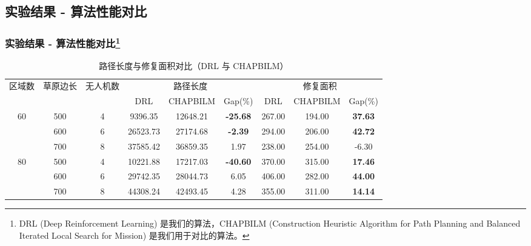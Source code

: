 \documentclass[10pt, aspectratio=169]{beamer}  %
\begin{document}
\subsection{实验结果 - 算法性能对比}
\begin{frame}
	\frametitle{实验结果 - 算法性能对比\footnote{DRL (Deep Reinforcement Learning) 是我们的算法，CHAPBILM (Construction Heuristic Algorithm for Path Planning and Balanced Iterated Local Search for Mission) 是我们用于对比的算法。}}
	\begin{table}
		\centering
		\caption{路径长度与修复面积对比（DRL 与 CHAPBILM）}
		\small %
		\setlength{\tabcolsep}{3pt}
		\begin{tabular}{ccc ccc ccc}
			\toprule
			\multirow{2}{*}{区域数} & \multirow{2}{*}{草原边长} & \multirow{2}{*}{ 无人机数} & \multicolumn{3}{c}{路径长度} & \multicolumn{3}{c}{修复面积}                                                        \\
			\cmidrule(lr){4-6}\cmidrule(lr){7-9}
			                     &                       &                        & DRL                      & CHAPBILM                 & Gap(\%)         & DRL    & CHAPBILM & Gap(\%)        \\
			\midrule
			\multirow{3}{*}{60}
			                     & 500                   & 4                      & 9396.35                  & 12648.21                 & \textbf{-25.68} & 267.00 & 194.00   & \textbf{37.63} \\
			                     & 600                   & 6                      & 26523.73                 & 27174.68                 & \textbf{-2.39}  & 294.00 & 206.00   & \textbf{42.72} \\
			                     & 700                   & 8                      & 37585.42                 & 36859.35                 & 1.97            & 238.00 & 254.00   & -6.30          \\
			\midrule
			\multirow{3}{*}{80}
			                     & 500                   & 4                      & 10221.88                 & 17217.03                 & \textbf{-40.60} & 370.00 & 315.00   & \textbf{17.46} \\
			                     & 600                   & 6                      & 29742.35                 & 28044.73                 & 6.05            & 406.00 & 282.00   & \textbf{44.00} \\
			                     & 700                   & 8                      & 44308.24                 & 42493.45                 & 4.28            & 355.00 & 311.00   & \textbf{14.14} \\
			\bottomrule
		\end{tabular}
		\label{tab:combined_comparison}
	\end{table}
\end{frame}
\end{document}

